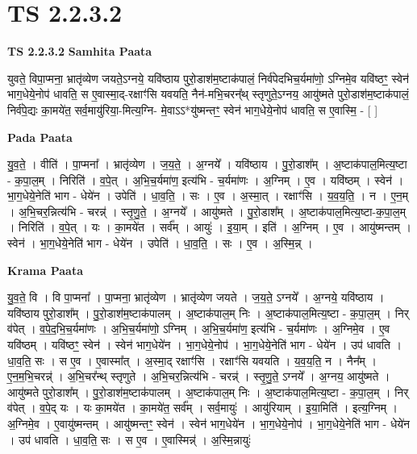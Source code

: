 \documentclass[17pt]{extarticle}
\begin{document}
\section{ TS 2.2.3.2 }

\textbf{TS 2.2.3.2 } \newline
\textbf{Samhita Paata} \newline

युवते॒ विपा॒प्मना॒ भ्रातृ॑व्येण जयते॒ऽग्नये॒ यवि॑ष्ठाय पुरो॒डाश॑म॒ष्टाक॑पालं॒ निर्व॑पेदभिच॒र्यमा॑णो॒ ऽग्निमे॒व यवि॑ष्ठꣳ॒॒ स्वेन॑ भाग॒धेये॒नोप॑ धावति॒ स ए॒वास्मा॒द्-रक्षाꣳ॑सि यवयति॒ नैन॑-मभि॒चरन्᳚थ् स्तृणुते॒ऽग्नय॒ आयु॑ष्मते पुरो॒डाश॑म॒ष्टाक॑पालं॒ निर्व॑पे॒द्यः का॒मये॑त॒ सर्व॒मायु॑रिया॒-मित्य॒ग्नि- मे॒वाऽऽ*यु॑ष्मन्तꣳ॒॒ स्वेन॑ भाग॒धेये॒नोप॑ धावति॒ स ए॒वास्मि॒ - [  ] \newline

\textbf{Pada Paata} \newline

यु॒व॒ते॒ । वीति॑ । पा॒प्मना᳚ । भ्रातृ॑व्येण । ज॒य॒ते॒ । अ॒ग्नये᳚ । यवि॑ष्ठाय । पु॒रो॒डाश᳚म् । अ॒ष्टाक॑पाल॒मित्य॒ष्टा - क॒पा॒ल॒म् । निरिति॑ । व॒पे॒त् । अ॒भि॒च॒र्यमा॑ण॒ इत्य॑भि - च॒र्यमा॑णः । अ॒ग्निम् । ए॒व । यवि॑ष्ठम् । स्वेन॑ । भा॒ग॒धेये॒नेति॑ भाग - धेये॑न । उपेति॑ । धा॒व॒ति॒ । सः । ए॒व । अ॒स्मा॒त् । रक्षाꣳ॑सि । य॒व॒य॒ति॒ । न । ए॒न॒म् । अ॒भि॒चर॒न्नित्य॑भि - चरन्न्॑ । स्तृ॒णु॒ते॒ । अ॒ग्नये᳚ । आयु॑ष्मते । पु॒रो॒डाश᳚म् । अ॒ष्टाक॑पाल॒मित्य॒ष्टा-क॒पा॒ल॒म् । निरिति॑ । व॒पे॒त् । यः । का॒मये॑त । सर्व᳚म् । आयुः॑ । इ॒या॒म् । इति॑ । अ॒ग्निम् । ए॒व । आयु॑ष्मन्तम् । स्वेन॑ । भा॒ग॒धेये॒नेति॑ भाग - धेये॑न । उपेति॑ । धा॒व॒ति॒ । सः । ए॒व । अ॒स्मि॒न्न् ।  \newline


\textbf{Krama Paata} \newline

यु॒व॒ते॒ वि । वि पा॒प्मना᳚ । पा॒प्मना॒ भ्रातृ॑व्येण । भ्रातृ॑व्येण जयते । ज॒य॒ते॒ ऽग्नये᳚ । अ॒ग्नये॒ यवि॑ष्ठाय । यवि॑ष्ठाय पुरो॒डाश᳚म् । पु॒रो॒डाश॑म॒ष्टाक॑पालम् । अ॒ष्टाक॑पाल॒म् निः । अ॒ष्टाक॑पाल॒मित्य॒ष्टा - क॒पा॒ल॒म् । निर् व॑पेत् । व॒पे॒द॒भि॒च॒र्यमा॑णः । अ॒भि॒च॒र्यमा॑णो॒ ऽग्निम् । अ॒भि॒च॒र्यमा॑ण॒ इत्य॑भि - च॒र्यमा॑णः । अ॒ग्निमे॒व । ए॒व यवि॑ष्ठम् । यवि॑ष्ठꣳ॒॒ स्वेन॑ । स्वेन॑ भाग॒धेये॑न । भा॒ग॒धेये॒नोप॑ । भा॒ग॒धेये॒नेति॑ भाग - धेये॑न । उप॑ धावति । धा॒व॒ति॒ सः । स ए॒व । ए॒वास्मा᳚त् । अ॒स्मा॒द् रक्षाꣳ॑सि । रक्षाꣳ॑सि यवयति । य॒व॒य॒ति॒ न । नैन᳚म् । ए॒न॒म॒भि॒चरन्न्॑ । अ॒भि॒चर᳚न्थ् स्तृणुते । अ॒भि॒चर॒न्नित्य॑भि - चरन्न्॑ । स्तृ॒णु॒ते॒ ऽग्नये᳚ । अ॒ग्नय॒ आयु॑ष्मते । आयु॑ष्मते पुरो॒डाश᳚म् । पु॒रो॒डाश॑म॒ष्टाक॑पालम् । अ॒ष्टाक॑पाल॒म् निः । अ॒ष्टाक॑पाल॒मित्य॒ष्टा - क॒पा॒ल॒म् । निर् व॑पेत् । व॒पे॒द् यः । यः का॒मये॑त । का॒मये॑त॒ सर्व᳚म् । सर्व॒मायुः॑ । आयु॑रियाम् । इ॒या॒मिति॑ । इत्य॒ग्निम् । अ॒ग्निमे॒व । ए॒वायु॑ष्मन्तम् । आयु॑ष्मन्तꣳ॒॒ स्वेन॑ । स्वेन॑ भाग॒धेये॑न । भा॒ग॒धेये॒नोप॑ । भा॒ग॒धेये॒नेति॑ भाग - धेये॑न । उप॑ धावति । धा॒व॒ति॒ सः । स ए॒व । ए॒वास्मिन्न्॑ । अ॒स्मि॒न्नायुः॑ \newline
\end{document}
